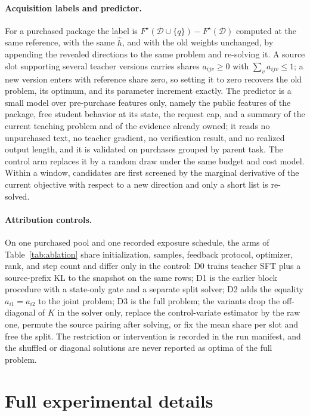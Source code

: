\paragraph{Acquisition labels and predictor.}
For a purchased package the label is
$F^{\star}(\mathcal{D}\cup\{q\})-F^{\star}(\mathcal{D})$ computed at
the same reference, with the same $\hat h$, and with the old weights
unchanged, by appending the revealed directions to the same problem
and re-solving it. A source slot supporting several teacher versions
carries shares $a_{ijv}\ge0$ with $\sum_v a_{ijv}\le1$; a new version
enters with reference share zero, so setting it to zero recovers the
old problem, its optimum, and its parameter increment exactly. The
predictor is a small model over pre-purchase features only, namely the
public features of the package, free student behavior at its state,
the request cap, and a summary of the current teaching problem and of
the evidence already owned; it reads no unpurchased text, no teacher
gradient, no verification result, and no realized output length, and
it is validated on purchases grouped by parent task. The control arm
replaces it by a random draw under the same budget and cost model.
Within a window, candidates are first screened by the marginal
derivative of the current objective with respect to a new direction
and only a short list is re-solved.

\paragraph{Attribution controls.}
On one purchased pool and one recorded exposure schedule, the arms of
Table~\ref{tab:ablation} share initialization, samples, feedback
protocol, optimizer, rank, and step count and differ only in the
control: D0 trains teacher SFT plus a source-prefix KL to the snapshot
on the same rows; D1 is the earlier block procedure with a state-only
gate and a separate split solver; D2 adds the equality
$a_{i1}=a_{i2}$ to the joint problem; D3 is the full problem; the
variants drop the off-diagonal of $K$ in the solver only, replace the
control-variate estimator by the raw one, permute the source pairing
after solving, or fix the mean share per slot and free the split. The
restriction or intervention is recorded in the run manifest, and the
shuffled or diagonal solutions are never reported as optima of the
full problem.

\section{Full experimental details}\label{app:details}

